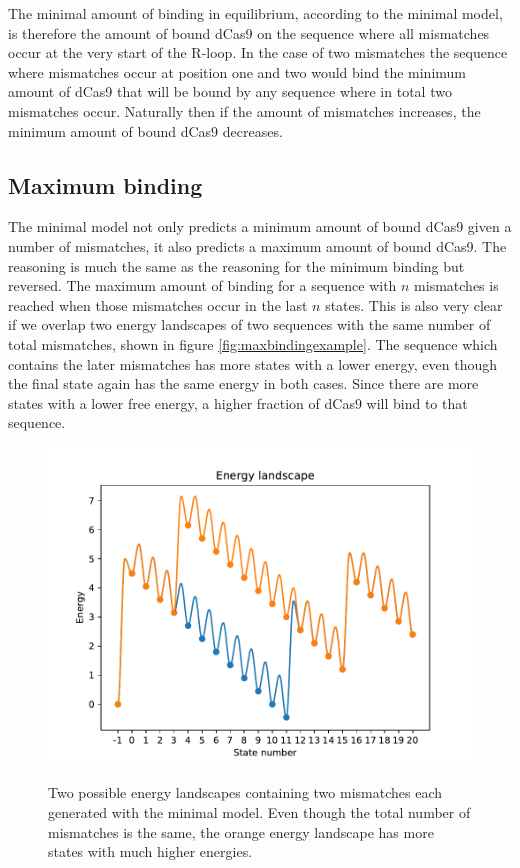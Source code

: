 The minimal amount of binding in equilibrium, according to the minimal model, is therefore the amount of bound dCas9 on the sequence where all mismatches occur at the very start of the R-loop. In the case of two mismatches the sequence where mismatches occur at position one and two would bind the minimum amount of dCas9 that will be bound by any sequence where in total two mismatches occur. Naturally then if the amount of mismatches increases, the minimum amount of bound dCas9 decreases.


\subsection{Maximum binding}
The minimal model not only predicts a minimum amount of bound dCas9 given a number of mismatches, it also predicts a maximum amount of bound dCas9. The reasoning is much the same as the reasoning for the minimum binding but reversed. The maximum amount of binding for a sequence with $n$ mismatches is reached when those mismatches occur in the last $n$ states. This is also very clear if we overlap two energy landscapes of two sequences with the same number of total mismatches, shown in figure \ref{fig:maxbindingexample}. The sequence which contains the later mismatches has more states with a lower energy, even though the final state again has the same energy in both cases. Since there are more states with a lower free energy, a higher fraction of dCas9 will bind to that sequence.

\begin{figure}[H]
\begin{center}
\includegraphics[width=\textwidth]{images/minbindingexample2}
\label{fig:minbindingexample}
\caption{Two possible energy landscapes containing two mismatches each generated with the minimal model. Even though the total number of mismatches is the same, the orange energy landscape has more states with much higher energies.}
\end{center}
\end{figure}


